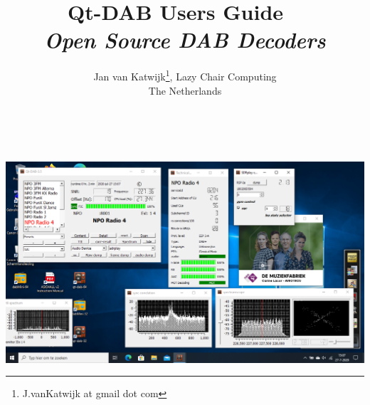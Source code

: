 \documentclass[12pt]{article}
\begin{document}
\title{Qt-DAB Users Guide
\ \\
{\it{\small  Open Source DAB Decoders}}
}
\author{
Jan van Katwijk\footnote{J.vanKatwijk at gmail dot com}, 
Lazy Chair Computing \\
The Netherlands}

\maketitle
\ \\
\begin{center}
\includegraphics[width=160mm]{qt-dab-1.png}
\end{center}
\newpage
\tableofcontents
\newpage
\end{document}
